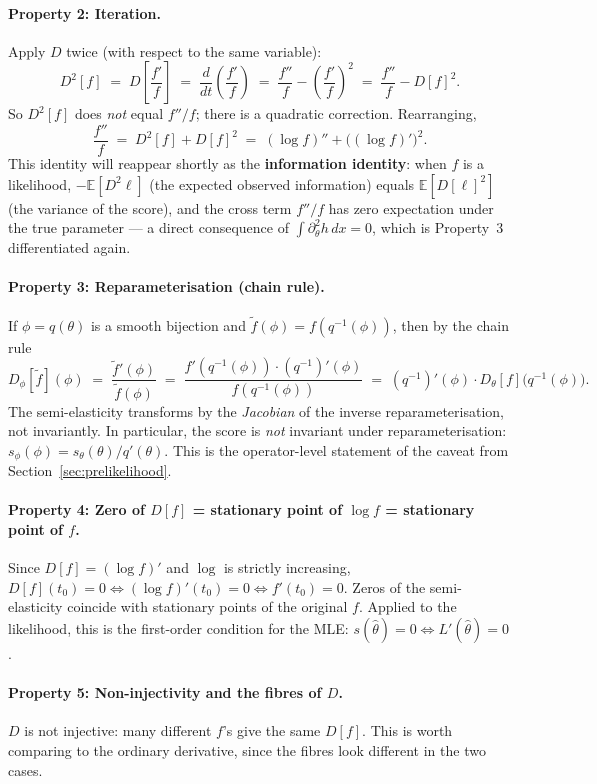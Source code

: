 \documentclass[a4paper,oneside,12pt]{extarticle}
\theoremstyle{plain}
\theoremstyle{definition}
\theoremstyle{remark}
\newcommand*{\E}{\mathbb{E}}
\begin{document}
\paragraph{Property 2: Iteration.}
Apply $D$ twice (with respect to the same variable):
\[
  D^2[f] \;=\; D\!\left[\frac{f'}{f}\right]
  \;=\; \frac{d}{dt}\!\left(\frac{f'}{f}\right)
  \;=\; \frac{f''}{f} - \left(\frac{f'}{f}\right)^2
  \;=\; \frac{f''}{f} - D[f]^2.
\]
So $D^2[f]$ does \emph{not} equal $f''/f$; there is a quadratic
correction.  Rearranging,
\[
  \frac{f''}{f} \;=\; D^2[f] + D[f]^2
  \;=\; (\log f)'' + \bigl((\log f)'\bigr)^2.
\]
This identity will reappear shortly as the \textbf{information
identity}: when $f$ is a likelihood, $-\E[D^2 \ell]$ (the expected
observed information) equals $\E[D[\ell]^2]$ (the variance of the
score), and the cross term $f''/f$ has zero expectation under the
true parameter --- a direct consequence of $\int \partial_\theta^2 h
\,dx = 0$, which is Property~3 differentiated again.

\paragraph{Property 3: Reparameterisation (chain rule).}
If $\phi = q(\theta)$ is a smooth bijection and $\tilde f(\phi) =
f(q^{-1}(\phi))$, then by the chain rule
\[
  D_\phi[\tilde f](\phi)
  \;=\; \frac{\tilde f'(\phi)}{\tilde f(\phi)}
  \;=\; \frac{f'(q^{-1}(\phi))\cdot (q^{-1})'(\phi)}{f(q^{-1}(\phi))}
  \;=\; (q^{-1})'(\phi) \cdot D_\theta[f]\bigl(q^{-1}(\phi)\bigr).
\]
The semi-elasticity transforms by the \emph{Jacobian} of the inverse
reparameterisation, not invariantly.  In particular, the score is
\emph{not} invariant under reparameterisation: $s_\phi(\phi) =
s_\theta(\theta)/q'(\theta)$.  This is the operator-level statement
of the caveat from Section~\ref{sec:prelikelihood}.

\paragraph{Property 4: Zero of $D[f]$ = stationary point of $\log f$ = stationary point of $f$.}
Since $D[f] = (\log f)'$ and $\log$ is strictly increasing,
$D[f](t_0) = 0 \iff (\log f)'(t_0) = 0 \iff f'(t_0) = 0$.  Zeros of
the semi-elasticity coincide with stationary points of the original
$f$.  Applied to the likelihood, this is the first-order condition
for the MLE: $s(\hat\theta) = 0 \iff L'(\hat\theta) = 0$.

\paragraph{Property 5: Non-injectivity and the fibres of $D$.}
$D$ is not injective: many different $f$'s give the same $D[f]$.
This is worth comparing to the ordinary derivative, since the
fibres look different in the two cases.
\end{document}
